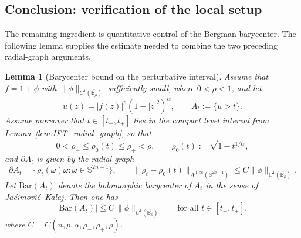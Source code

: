 \documentclass[11pt]{amsart}
\theoremstyle{plain}
\newtheorem{lemma}[theorem]{Lemma}
\theoremstyle{definition}
\theoremstyle{remark}
\newcommand{\B}{\mathbb{B}}
\newcommand{\Sn}{\mathbb{S}^{2n-1}}
\begin{document}
\subsection{Conclusion: verification of the local setup}

The remaining ingredient is quantitative control of the Bergman barycenter.
The following lemma supplies the estimate needed to combine the two preceding
radial-graph arguments.

\begin{lemma}[Barycenter bound on the perturbative interval]\label{lem:barycenter_bound_appendix}
Assume that \(f=1+\phi\) with \(\|\phi\|_{C^1(\overline{\B_\rho})}\) sufficiently small, where
\(0<\rho<1\), and let
\[
u(z)=|f(z)|^p(1-|z|^2)^\alpha,
\qquad
A_t:=\{u>t\}.
\]
Assume moreover that \(t\in[t_-,t_+]\) lies in the compact level interval from
Lemma~\ref{lem:IFT_radial_graph}, so that
\[
0<\rho_-\le \rho_0(t)\le \rho_+<\rho,
\qquad
\rho_0(t):=\sqrt{1-t^{1/\alpha}},
\]
and \(\partial A_t\) is given by the radial graph
\[
\partial A_t=\{\rho_t(\omega)\omega:\omega\in\Sn\},
\qquad
\|\rho_t-\rho_0(t)\|_{W^{1,\infty}(\Sn)}
\le C\|\phi\|_{C^1(\overline{\B_\rho})}.
\]
Let \(\mathrm{Bar}(A_t)\) denote the holomorphic barycenter of \(A_t\) in the sense of
Ja\'cimovi\'c--Kalaj. Then one has
\[
|\mathrm{Bar}(A_t)|
\le
C\,\|\phi\|_{C^1(\overline{\B_\rho})}
\qquad\text{for all }t\in[t_-,t_+],
\]
where \(C=C(n,p,\alpha,\rho_-,\rho_+,\rho)\).
\end{lemma}
\end{document}
